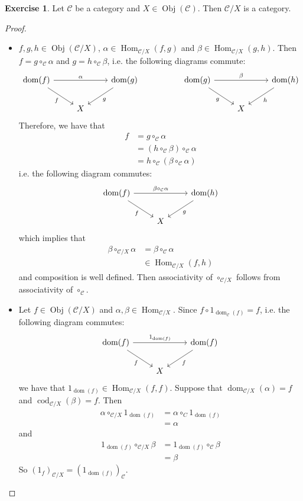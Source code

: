 \documentclass[12pt]{amsart}
\theoremstyle{definition}
\newtheorem{ex}[definition]{Exercise}
\newcommand{\al}{\alpha}
\newcommand{\be}{\beta}
\newcommand{\MC}{\mathcal{C}}
\DeclareMathOperator{\dom}{dom}
\DeclareMathOperator{\cod}{cod}
\DeclareMathOperator{\Obj}{Obj}
\DeclareMathOperator{\Hom}{Hom}
\begin{document}
	\begin{ex}
		Let $\MC$ be a category and $X \in \Obj(\MC)$. Then $\MC / X$ is a category.
	\end{ex}

	\begin{proof}\
		\begin{itemize}
			\item $f,g, h \in \Obj(\MC / X)$, $\al \in \Hom_{\MC / X}(f, g)$ and $\be \in \Hom_{\MC / X}(g, h)$. Then $f = g \circ_{\MC} \al$ and $g = h \circ_{\MC} \be$, i.e. the following diagrams commute:
			\[ \begin{tikzcd}
				\dom(f) \arrow[rr, "\al"] \arrow[dr, "f"'] 	
				&& \dom(g)  \arrow[dl, "g"]  
				&& \dom(g) \arrow[rr, "\be"] \arrow[dr, "g"'] 	
				&& \dom(h)  \arrow[dl, "h"]\\
				& X 
				&& &&X
			\end{tikzcd}
			\]
			Therefore, we have that 
			\begin{align*}
				f 
				& = g \circ_{\MC} \al \\
				& = (h \circ_{\MC} \be) \circ_{\MC} \al \\
				&= h \circ_{\MC} (\be \circ_{\MC} \al) 
			\end{align*}
			i.e. the following diagram commutes:
			\[ \begin{tikzcd}
				\dom(f) \arrow[rr, "\be \circ_{\MC} \al"] \arrow[dr, "f"'] 	
				& & \dom(h)  \arrow[dl, "g"] \\
				& X 
			\end{tikzcd}
			\]
			which implies that 
			\begin{align*}
				\be \circ_{\MC / X} \al 
				& = \be \circ_{\MC} \al \\
				& \in \Hom_{\MC / X}(f, h)
			\end{align*}
			and composition is well defined. Then associativity of $\circ_{\MC / X}$ follows from associativity of $\circ_\MC$.
			\item Let $f \in \Obj(\MC / X)$ and $\al, \be \in \Hom_{\MC / X}$. Since $f \circ 1_{\dom_{\MC}(f)} = f$, i.e. the following diagram commutes: 
			\[ \begin{tikzcd}
				\dom(f) \arrow[rr, "1_{\dom(f)}"] \arrow[dr, "f"'] 	
				& & \dom(f)  \arrow[dl, "f"] \\
				& X 
			\end{tikzcd}
			\]
			we have that $1_{\dom(f)} \in \Hom_{\MC / X}(f, f)$.
			Suppose that $\dom_{\MC / X}(\al) = f$ and $\cod_{\MC /X}(\be) = f$. Then 
			\begin{align*}
				\al \circ_{\MC /X} 1_{\dom(f)}
				&= \al \circ_{C} 1_{\dom(f)} \\
				&= \al
			\end{align*}
			and 
			\begin{align*}
				1_{\dom(f)} \circ_{\MC /X} \be
				&= 1_{\dom(f)} \circ_{\MC} \be \\
				&= \be
			\end{align*}
			So $(1_f)_{\MC / X} = (1_{\dom(f)})_{\MC}$.
		\end{itemize}
	\end{proof}
	
\end{document}
